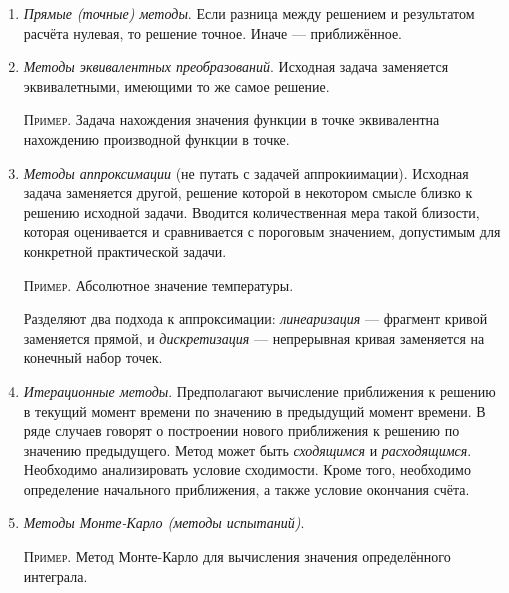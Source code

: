 \documentclass{article}
\begin{document}
\begin{enumerate}
  \item \textit{Прямые (точные) методы}. Если разница между решением и
    результатом расчёта нулевая, то решение точное. Иначе --- приближённое.

  \item \textit{Методы эквивалентных преобразований}. Исходная задача заменяется
    эквивалетными, имеющими то же самое решение.

    \textsc{Пример}. Задача нахождения значения функции в точке эквивалентна
    нахождению производной функции в точке.
    
  \item \textit{Методы аппроксимации} (не путать с задачей аппрокиимации).
    Исходная задача заменяется другой, решение которой в некотором смысле близко
    к решению исходной задачи. Вводится количественная мера такой близости,
    которая оценивается и сравнивается с пороговым значением, допустимым для
    конкретной практической задачи.

    \textsc{Пример}. Абсолютное значение температуры.

    Разделяют два подхода к аппроксимации: \textit{линеаризация} --- фрагмент
    кривой заменяется прямой, и \textit{дискретизация} --- непрерывная кривая
    заменяется на конечный набор точек.

  \item \textit{Итерационные методы}. Предполагают вычисление приближения к
    решению в текущий момент времени по значению в предыдущий момент времени. В
    ряде случаев говорят о построении нового приближения к решению по значению
    предыдущего. Метод может быть \textit{сходящимся} и \textit{расходящимся}.
    Необходимо анализировать условие сходимости. Кроме того, необходимо
    определение начального приближения, а также условие окончания счёта.

  \item \textit{Методы Монте-Карло (методы испытаний)}.

    \textsc{Пример}. Метод Монте-Карло для вычисления значения определённого
    интеграла.

\end{enumerate}
\end{document}
